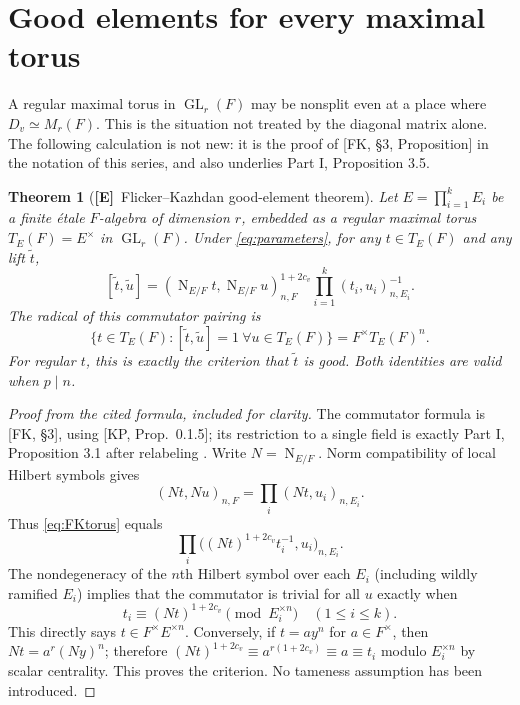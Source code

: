 \documentclass[11pt]{article}
\newcommand{\GL}{\operatorname{GL}}
\newcommand{\Nm}{\operatorname{N}}
\newcommand{\Etag}{\textnormal{\textbf{[E]}}}
\theoremstyle{plain}
\newtheorem{theorem}{Theorem}[section]
\theoremstyle{definition}
\begin{document}
\section{Good elements for every maximal torus}\label{sec:good}
A regular maximal torus in $\GL_r(F)$ may be nonsplit even at a
place where $D_v\simeq M_r(F)$.  This is the situation not treated by
the diagonal matrix alone.  The following calculation is not new:
it is the proof of [FK, \S3, Proposition] in the notation of this
series, and also underlies Part I, Proposition 3.5.

\begin{theorem}[\Etag\ Flicker--Kazhdan good-element theorem]\label{thm:FKgood}
Let $E=\prod_{i=1}^kE_i$ be a finite \emph{\'etale} $F$-algebra
of dimension $r$, embedded as a regular maximal torus
$T_E(F)=E^\times$ in $\GL_r(F)$.  Under \eqref{eq:parameters},
for any $t\in T_E(F)$ and any lift $\widetilde t$,
\begin{equation}\label{eq:FKtorus}
 [\widetilde t,\widetilde u]
 =(\Nm_{E/F}t,\Nm_{E/F}u)_{n,F}^{1+2c_v}
   \prod_{i=1}^k(t_i,u_i)_{n,E_i}^{-1}.
\end{equation}
The radical of this commutator pairing is
\begin{equation}\label{eq:everygood}
 \{t\in T_E(F):[\widetilde t,\widetilde u]=1\ \forall u\in T_E(F)\}
 =F^\times T_E(F)^n.
\end{equation}
For regular $t$, this is exactly the criterion that $\widetilde t$
is good.  Both identities are valid when $p\mid n$.
\end{theorem}
\begin{proof}[Proof from the cited formula, included for clarity]
The commutator formula is [FK, \S3], using [KP, Prop.~0.1.5];
its restriction to a single field is exactly Part I,
Proposition 3.1 after relabeling \cite{JoynerI}.  Write $N=\Nm_{E/F}$.
Norm compatibility of local Hilbert symbols gives
\[
 (Nt,Nu)_{n,F}
 =\prod_i(Nt,u_i)_{n,E_i}.
\]
Thus \eqref{eq:FKtorus} equals
\[
 \prod_i\bigl((Nt)^{1+2c_v}t_i^{-1},u_i\bigr)_{n,E_i}.
\]
The nondegeneracy of the $n$th Hilbert symbol over each $E_i$
(including wildly ramified $E_i$) implies that the commutator is
trivial for all $u$ exactly when
\begin{equation}\label{eq:pointwisegood}
 t_i\equiv(Nt)^{1+2c_v}\pmod{E_i^{\times n}}
 \quad (1\leq i\leq k).
\end{equation}
This directly says $t\in F^\times E^{\times n}$.  Conversely,
if $t=ay^n$ for $a\in F^\times$, then
$Nt=a^r(Ny)^n$; therefore
$(Nt)^{1+2c_v}\equiv a^{r(1+2c_v)}\equiv a\equiv t_i$
modulo $E_i^{\times n}$ by scalar centrality.  This proves the
criterion.  No tameness assumption has been introduced.
\end{proof}
\end{document}
